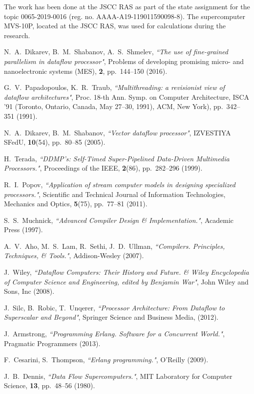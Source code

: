 \documentclass[
11pt,%
tightenlines,%
twoside,%
onecolumn,%
nofloats,%
nobibnotes,%
nofootinbib,%
superscriptaddress,%
noshowpacs,%
centertags]%
{revtex4}
\begin{document}
\begin{acknowledgments}
The work has been done at the JSCC RAS as part of the state assignment for the topic 0065-2019-0016 (reg. no. AAAA-A19-119011590098-8).
The supercomputer MVS-10P, located at the JSCC RAS, was used for calculations during the research.
\end{acknowledgments}

\begin{thebibliography}{99}

N.~A.~Dikarev, B.~M.~Shabanov, A.~S.~Shmelev, {\it ``The use of fine-grained parallelism in dataflow processor"}, Problems of developing promising micro- and nanoelectronic systems (MES), {\bf 2}, pp.~144--150 (2016).

G.~V.~Papadopoulos, K.~R.~Traub, {\it ``Multithreading: a revisionist view of
dataflow architectures"}, Proc. 18-th Ann. Symp. on Computer Architecture,
ISCA ’91 (Toronto, Ontario, Canada, May 27–30, 1991), ACM, New York), pp.~342--351 (1991).

N.~A.~Dikarev, B.~M.~Shabanov, {\it ``Vector dataflow processor"}, IZVESTIYA SFedU, {\bf 10}(54), pp.~80--85 (2005).

H.~Terada, {\it ``DDMP’s: Self-Timed Super-Pipelined Data-Driven Multimedia Processors."}, Proceedings of the IEEE, {\bf 2}(86), pp.~282--296 (1999).

R.~I.~Popov, {\it ``Application of stream computer models in designing specialized processors."}, Scientific and Technical Journal of Information Technologies, Mechanics and Optics, {\bf 5}(75), pp.~77--81 (2011).

S.~S.~Muchnick, {\it ``Advanced Compiler Design \& Implementation."}, Academic Press (1997).

A.~V.~Aho, M.~S.~Lam, R.~Sethi, J.~D.~Ullman, {\it ``Compilers. Principles, Techniques, \& Tools."}, Addison-Wesley (2007).

J.~Wiley, {\it ``Dataflow Computers: Their History and Future. \& Wiley Encyclopedia of Computer Science and Engineering, edited by Benjamin War"}, John Wiley and Sons, Inc (2008).

J.~Silc, B.~Robic, T.~Unqerer, {\it ``Processor Architecture: From Dataflow to Superscalar and Beyond"}, Springer Science and Business Media, (2012).

J.~Armstrong, {\it ``Programming Erlang. Software for a Concurrent World."}, Pragmatic Programmers (2013).

F.~Cesarini, S.~Thompson, {\it ``Erlang programming."}, O'Reilly (2009).

J.~B.~Dennis, {\it ``Data Flow Supercomputers."}, MIT Laboratory for Computer Science, {\bf 13}, pp.~48--56 (1980).

\end{thebibliography}
\end{document}
